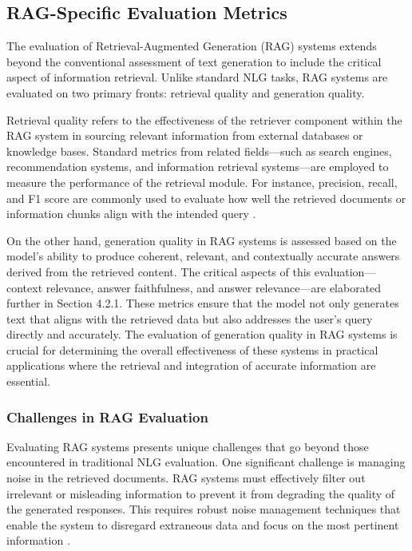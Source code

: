 \subsection{RAG-Specific Evaluation Metrics}

The evaluation of Retrieval-Augmented Generation (RAG) systems extends beyond the conventional assessment of text generation to include the critical aspect of information retrieval. Unlike standard NLG tasks, RAG systems are evaluated on two primary fronts: retrieval quality and generation quality. 

Retrieval quality refers to the effectiveness of the retriever component within the RAG system in sourcing relevant information from external databases or knowledge bases. Standard metrics from related fields—such as search engines, recommendation systems, and information retrieval systems—are employed to measure the performance of the retrieval module. For instance, precision, recall, and F1 score are commonly used to evaluate how well the retrieved documents or information chunks align with the intended query \cite{gao2023retrieval}.

On the other hand, generation quality in RAG systems is assessed based on the model’s ability to produce coherent, relevant, and contextually accurate answers derived from the retrieved content. The critical aspects of this evaluation—context relevance, answer faithfulness, and answer relevance—are elaborated further in Section 4.2.1. These metrics ensure that the model not only generates text that aligns with the retrieved data but also addresses the user’s query directly and accurately. The evaluation of generation quality in RAG systems is crucial for determining the overall effectiveness of these systems in practical applications where the retrieval and integration of accurate information are essential.

\subsubsection{Challenges in RAG Evaluation}

Evaluating RAG systems presents unique challenges that go beyond those encountered in traditional NLG evaluation. One significant challenge is managing noise in the retrieved documents. RAG systems must effectively filter out irrelevant or misleading information to prevent it from degrading the quality of the generated responses. This requires robust noise management techniques that enable the system to disregard extraneous data and focus on the most pertinent information \cite{gao2023retrieval}.

